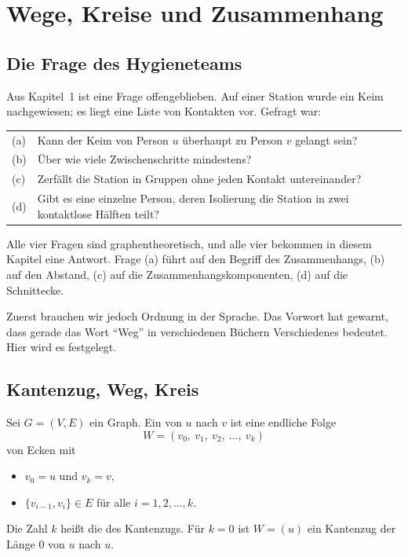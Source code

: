 \chapter{Wege, Kreise und Zusammenhang}

\section{Die Frage des Hygieneteams}

Aus Kapitel~1 ist eine Frage offengeblieben. Auf einer Station wurde ein Keim nachgewiesen; es liegt eine Liste von Kontakten vor. Gefragt war:

\begin{merksatz}
\begin{center}
\renewcommand{\arraystretch}{1.5}
\begin{tabular}{@{}P{1.0cm}P{7.4cm}@{}}
\toprule
(a) & Kann der Keim von Person $u$ überhaupt zu Person $v$ gelangt sein?\\
(b) & Über wie viele Zwischenschritte mindestens?\\
(c) & Zerfällt die Station in Gruppen ohne jeden Kontakt untereinander?\\
(d) & Gibt es eine einzelne Person, deren Isolierung die Station in zwei kontaktlose Hälften teilt?\\
\bottomrule
\end{tabular}
\end{center}
\end{merksatz}

Alle vier Fragen sind graphentheoretisch, und alle vier bekommen in diesem Kapitel eine Antwort. Frage (a) führt auf den Begriff des Zusammenhangs, (b) auf den Abstand, (c) auf die Zusammenhangskomponenten, (d) auf die Schnittecke.

Zuerst brauchen wir jedoch Ordnung in der Sprache. Das Vorwort hat gewarnt, dass gerade das Wort \enquote{Weg} in verschiedenen Büchern Verschiedenes bedeutet. Hier wird es festgelegt.

\section{Kantenzug, Weg, Kreis}

\begin{definition}
Sei $G = (V,E)$ ein Graph. Ein  von $u$ nach $v$ ist eine endliche Folge
\[ W = (v_0,\ v_1,\ v_2,\ \ldots,\ v_k) \]
von Ecken mit
\begin{itemize}[leftmargin=1.4em, itemsep=3pt]
\item $v_0 = u$ und $v_k = v$,
\item $\{v_{i-1}, v_i\} \in E$ für alle $i = 1, 2, \ldots, k$.
\end{itemize}
Die Zahl $k$ heißt die  des Kantenzugs. Für $k = 0$ ist $W = (u)$ ein Kantenzug der Länge $0$ von $u$ nach $u$.
\end{definition}


